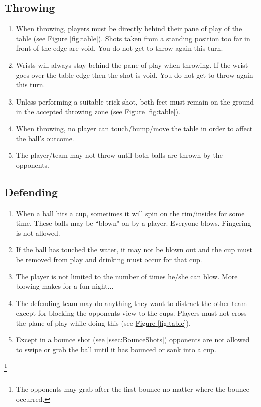 	\subsection{Throwing}\label{ssec:Throwing}
        \begin{enumerate}[label=(\roman*)]
            \item \label{sssec:Throwing,stand_behind} When throwing, players must be directly behind their pane of play of the table (see \hyperref[fig:table]{Figure \ref{fig:table}}).
                Shots taken from a standing position too far in front of the edge are void. You do not get to throw again this turn. 
            \item \label{sssec:Throwing,wrists} Wrists will always stay behind the pane of play when throwing.
                If the wrist goes over the table edge then the shot is void. You do not get to throw again this turn. 
            \item \label{sssec:Throwing,feet} Unless performing a suitable trick-shot, both feet must remain on the ground in the accepted throwing zone (see \hyperref[fig:table]{Figure \ref{fig:table}}). 
            \item \label{sssec:Throwing,bumping_table} When throwing, no player can touch/bump/move the table in order to affect the ball's outcome. 
            \item \label{sssec:Throwing,possesion} The player/team may not throw until both balls are thrown by the opponents. 
        \end{enumerate}
    \subsection{Defending}\label{ssec:Defending}
		\begin{enumerate}[label=(\roman*)]
            \item \label{sssec:Defending,blowing} When a ball hits a cup, sometimes it will spin on the rim/insides for some time.
                These balls may be ``blown" on by a player.
                Everyone blows.
                Fingering is not allowed. 
            \item \label{ssec:Defending,blowing_voids} If the ball has touched the water, it may not be blown out and the cup must be removed from play and drinking must occur for that cup. 
            \item \label{sssec:Defending,blowing_times} The player is not limited to the number of times he/she can blow. More blowing makes for a fun night... 
            \item \label{sssec:Defending,pysycedout} The defending team may do anything they want to distract the other team except for blocking the opponents view to the cups.
                Players must not cross the plane of play while doing this (see \hyperref[fig:table]{Figure \ref{fig:table}}). 
            \item \label{sssec:Defending,balltouching} Except in a bounce shot (see \ref{ssec:BounceShots}) opponents are not allowed to swipe or grab the ball until it has bounced or sank into a cup. 
        \end{enumerate}
        \footnote{The opponents may grab after the first bounce no matter where the bounce occurred.}
